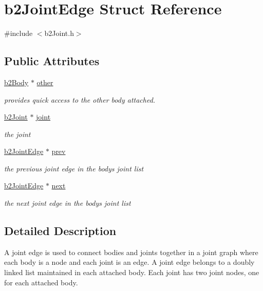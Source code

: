 \hypertarget{structb2_joint_edge}{}\section{b2\+Joint\+Edge Struct Reference}
\label{structb2_joint_edge}


{\ttfamily \#include $<$b2\+Joint.\+h$>$}

\subsection*{Public Attributes}
\begin{DoxyCompactItemize}
\item 
\mbox{\hyperlink{classb2_body}{b2\+Body}} $\ast$ \mbox{\hyperlink{structb2_joint_edge_a64aef21fb91211871de8796baecccb95}{other}}
\begin{DoxyCompactList}\small\item\em provides quick access to the other body attached. \end{DoxyCompactList}\item 
\mbox{\hyperlink{classb2_joint}{b2\+Joint}} $\ast$ \mbox{\hyperlink{structb2_joint_edge_ab5bac5d495af1280c50271f56a221503}{joint}}
\begin{DoxyCompactList}\small\item\em the joint \end{DoxyCompactList}\item 
\mbox{\hyperlink{structb2_joint_edge}{b2\+Joint\+Edge}} $\ast$ \mbox{\hyperlink{structb2_joint_edge_acc3621e38d9664db2805e0fc29d71335}{prev}}
\begin{DoxyCompactList}\small\item\em the previous joint edge in the body\textquotesingle{}s joint list \end{DoxyCompactList}\item 
\mbox{\hyperlink{structb2_joint_edge}{b2\+Joint\+Edge}} $\ast$ \mbox{\hyperlink{structb2_joint_edge_a3d17286bc697bb620ee151e4cd07438c}{next}}
\begin{DoxyCompactList}\small\item\em the next joint edge in the body\textquotesingle{}s joint list \end{DoxyCompactList}\end{DoxyCompactItemize}


\subsection{Detailed Description}
A joint edge is used to connect bodies and joints together in a joint graph where each body is a node and each joint is an edge. A joint edge belongs to a doubly linked list maintained in each attached body. Each joint has two joint nodes, one for each attached body. 

